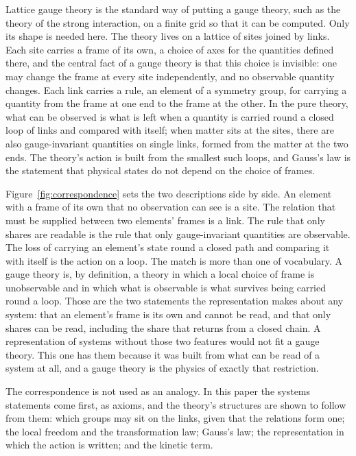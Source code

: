\documentclass[11pt,a4paper]{article}
\theoremstyle{plain}
\theoremstyle{definition}
\theoremstyle{remark}
\begin{document}
Lattice gauge theory is the standard way of putting a gauge theory, such as the theory of the strong interaction, on a finite grid so that it can be computed. Only its shape is needed here. The theory lives on a lattice of sites joined by links. Each site carries a frame of its own, a choice of axes for the quantities defined there, and the central fact of a gauge theory is that this choice is invisible: one may change the frame at every site independently, and no observable quantity changes. Each link carries a rule, an element of a symmetry group, for carrying a quantity from the frame at one end to the frame at the other. In the pure theory, what can be observed is what is left when a quantity is carried round a closed loop of links and compared with itself; when matter sits at the sites, there are also gauge-invariant quantities on single links, formed from the matter at the two ends. The theory's action is built from the smallest such loops, and Gauss's law is the statement that physical states do not depend on the choice of frames.

Figure~\ref{fig:correspondence} sets the two descriptions side by side. An element with a frame of its own that no observation can see is a site. The relation that must be supplied between two elements' frames is a link. The rule that only shares are readable is the rule that only gauge-invariant quantities are observable. The loss of carrying an element's state round a closed path and comparing it with itself is the action on a loop. The match is more than one of vocabulary. A gauge theory is, by definition, a theory in which a local choice of frame is unobservable and in which what is observable is what survives being carried round a loop. Those are the two statements the representation makes about any system: that an element's frame is its own and cannot be read, and that only shares can be read, including the share that returns from a closed chain. A representation of systems without those two features would not fit a gauge theory. This one has them because it was built from what can be read of a system at all, and a gauge theory is the physics of exactly that restriction.

The correspondence is not used as an analogy. In this paper the systems statements come first, as axioms, and the theory's structures are shown to follow from them: which groups may sit on the links, given that the relations form one; the local freedom and the transformation law; Gauss's law; the representation in which the action is written; and the kinetic term.
\end{document}
